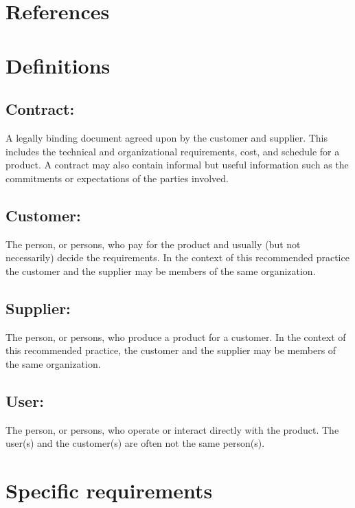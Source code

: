 \documentclass[10pt,journal,compsoc]{IEEEtran}
\begin{document}
\section{References}

\vfill

\section{Definitions}
\vspace{3mm}
\subsection{\textbf{Contract:}}
A legally binding document agreed upon by the customer and supplier. This includes the technical and organizational requirements, cost, and schedule for a product. A contract may also contain informal but useful information such as the commitments or expectations of the parties involved.
 
\subsection{\textbf{Customer:}}
The person, or persons, who pay for the product and usually (but not necessarily) decide the requirements. In the context of this recommended practice the customer and the supplier may be members of the same organization.

\subsection{\textbf{Supplier:}}
The person, or persons, who produce a product for a customer. In the context of this recommended practice, the customer and the supplier may be members of the same organization.

\subsection{\textbf{User:}}
The person, or persons, who operate or interact directly with the product. The user(s) and the customer(s) are often not the same person(s).

\vfill

\newpage

\section{Specific requirements}
\vspace{3mm}
\end{document}
